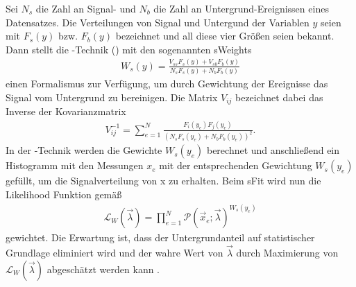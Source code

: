 Sei $N_s$ die Zahl an Signal- und $N_b$ die Zahl an Untergrund-Ereignissen eines Datensatzes. Die Verteilungen von Signal und Untergund der Variablen $y$ seien mit $F_s(y)$ bzw. $F_b(y)$ bezeichnet und all diese vier Größen seien bekannt. Dann stellt die \SPlot-Technik (\cite{splot}) mit den sogenannten \glqq sWeights\grqq 
\begin{align}
W_s(y) = \frac{V_{ss}F_s(y)+V_{sb}F_b(y)}{N_sF_s(y)+N_bF_b(y)}
\end{align} 
einen Formalismus zur Verfügung, um durch Gewichtung der Ereignisse das Signal vom Untergrund zu bereinigen. Die Matrix $V_{ij}$ bezeichnet dabei das Inverse der Kovarianzmatrix
\begin{align}
V_{ij}^{-1} = \sum_{e=1}^N \frac{F_i(y_e)F_j(y_e)}{(N_sF_s(y_e)+N_bF_b(y_e))^2}.
\end{align}
In der \SPlot-Technik werden die Gewichte $W_s(y_e)$ berechnet und anschließend ein Histogramm mit den Messungen $x_e$ mit der entsprechenden Gewichtung $W_s(y_e)$ gefüllt, um die Signalverteilung von x zu erhalten. Beim sFit wird nun die Likelihood Funktion gemäß
\begin{align}
\mathcal{L}_W(\vec{\lambda}) = \prod_{e=1}^N \mathcal{P}(\vec{x}_e;\vec{\lambda})^{W_s(y_e)}
\end{align}
gewichtet. Die Erwartung ist, dass der Untergrundanteil auf statistischer Grundlage eliminiert wird und der wahre Wert von $\vec{\lambda}$ durch Maximierung von $\mathcal{L}_W(\vec{\lambda})$ abgeschätzt werden kann \cite{sfit}.

